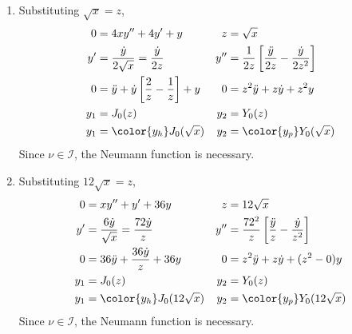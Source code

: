 \begin{enumerate}
    \item Substituting $ \sqrt{x} = z $,
          \begin{align}
              0   & = 4xy'' + 4y' + y                                                 &
              z   & = \sqrt{x}                                                          \\
              y'  & = \frac{\dot{y}}{2\sqrt{x}} = \frac{\dot{y}}{2z}                  &
              y'' & = \frac{1}{2z} \left[ \frac{\ddot{y}}{2z}
              - \frac{\dot{y}}{2z^2} \right]                                            \\
              0   & = \ddot{y} + \dot{y} \left[ \frac{2}{z} - \frac{1}{z} \right] + y &
              0   & = z^2 \ddot{y} + z\dot{y} + z^2y                                    \\
              y_1 & = J_0(z)                                                          &
              y_2 & = Y_0(z)                                                            \\
              y_1 & = \color{y_h}J_0(\sqrt{x})                                        &
              y_2 & = \color{y_p}Y_0(\sqrt{x})
          \end{align}
          Since $ \nu \in \mathcal{I} $, the Neumann function is necessary.

    \item Substituting $ 12\sqrt{x} = z $,
          \begin{align}
              0   & = xy'' + y' + 36y                                 &
              z   & = 12\sqrt{x}                                        \\
              y'  & = \frac{6\dot{y}}{\sqrt{x}} = \frac{72\dot{y}}{z} &
              y'' & = \frac{72^2}{z} \left[ \frac{\ddot{y}}{z}
              - \frac{\dot{y}}{z^2} \right]                             \\
              0   & = 36 \ddot{y} + \frac{36\dot{y}}{z} + 36y         &
              0   & = z^2 \ddot{y} + z\dot{y} + (z^2 - 0)y              \\
              y_1 & = J_0(z)                                          &
              y_2 & = Y_0(z)                                            \\
              y_1 & = \color{y_h}J_0(12\sqrt{x})                      &
              y_2 & = \color{y_p}Y_0(12\sqrt{x})
          \end{align}
          Since $ \nu \in \mathcal{I} $, the Neumann function is necessary.


\end{enumerate}
